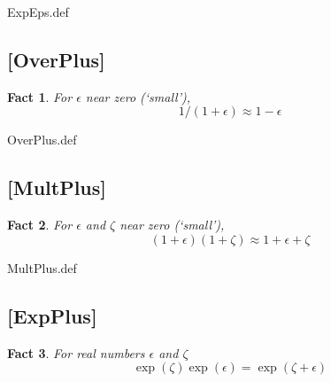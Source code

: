 \documentclass{handout}
\newtheorem{Fact}{Fact}
\begin{document}
\begin{verbatimwrite}{ExpEps.def}
\providecommand{\ExpEps}{\href{http://www.econ2.jhu.edu/people/ccarroll/public/LectureNotes/MathFacts/MathFactsList\#ExpEps}{\ensuremath{\mathtt{[ExpEps]}}}}
\end{verbatimwrite}


\hypertarget{OverPlus}{}
\subsection{[OverPlus]}
\begin{Fact} For $\epsilon$ near zero (`small'), 
\begin{equation}
1/(1+\epsilon) \approx 1-\epsilon
\end{equation}
\end{Fact}

\begin{verbatimwrite}{OverPlus.def}
\providecommand{\OverPlus}{\href{http://www.econ2.jhu.edu/people/ccarroll/public/LectureNotes/MathFacts/MathFactsList\#OverPlus}{\ensuremath{\mathtt{[OverPlus]}}}}
\end{verbatimwrite}


\hypertarget{MultPlus}{}
\subsection{[MultPlus]}
\begin{Fact} For $\epsilon$ and $\zeta$ near zero (`small'), 
\begin{equation}
(1+\epsilon)(1+\zeta) \approx 1+\epsilon+\zeta
\end{equation}
\end{Fact}

\begin{verbatimwrite}{MultPlus.def}
\providecommand{\MultPlus}{\href{http://www.econ2.jhu.edu/people/ccarroll/public/LectureNotes/MathFacts/MathFactsList\#MultPlus}{\ensuremath{\mathtt{[MultPlus]}}}}
\end{verbatimwrite}

\hypertarget{ExpPlus}{}
\subsection{[ExpPlus]}
\begin{Fact} For real numbers $\epsilon$ and $\zeta$ 
\begin{equation}
\exp(\zeta)\exp(\epsilon) = \exp(\zeta+\epsilon)
\end{equation}
\end{Fact}
\end{document}
